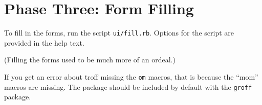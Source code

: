 \section{Phase Three: Form Filling}

To fill in the forms, run the script \texttt{ui/fill.rb}. Options for the script
are provided in the help text.

(Filling the forms used to be much more of an ordeal.)

If you get an error about troff missing the \texttt{om} macros, that is because
the ``mom'' macros are missing. The package should be included by default with
the \texttt{groff} package.

